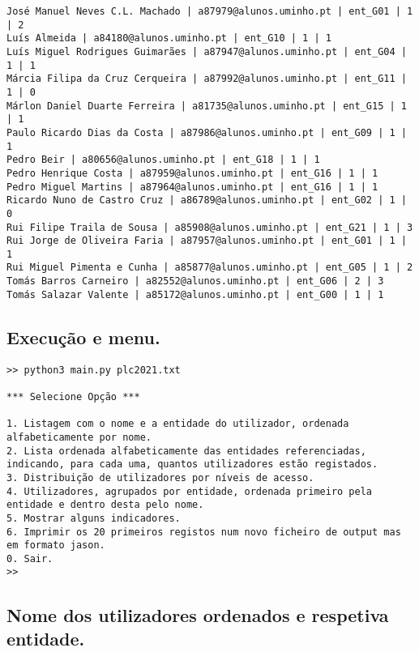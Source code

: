 \documentclass[11pt,a4paper]{report}%
\begin{document}
\begin{verbatim}
José Manuel Neves C.L. Machado | a87979@alunos.uminho.pt | ent_G01 | 1 | 2
Luís Almeida | a84180@alunos.uminho.pt | ent_G10 | 1 | 1
Luís Miguel Rodrigues Guimarães | a87947@alunos.uminho.pt | ent_G04 | 1 | 1
Márcia Filipa da Cruz Cerqueira | a87992@alunos.uminho.pt | ent_G11 | 1 | 0
Márlon Daniel Duarte Ferreira | a81735@alunos.uminho.pt | ent_G15 | 1 | 1
Paulo Ricardo Dias da Costa | a87986@alunos.uminho.pt | ent_G09 | 1 | 1
Pedro Beir | a80656@alunos.uminho.pt | ent_G18 | 1 | 1
Pedro Henrique Costa | a87959@alunos.uminho.pt | ent_G16 | 1 | 1
Pedro Miguel Martins | a87964@alunos.uminho.pt | ent_G16 | 1 | 1
Ricardo Nuno de Castro Cruz | a86789@alunos.uminho.pt | ent_G02 | 1 | 0
Rui Filipe Traila de Sousa | a85908@alunos.uminho.pt | ent_G21 | 1 | 3
Rui Jorge de Oliveira Faria | a87957@alunos.uminho.pt | ent_G01 | 1 | 1
Rui Miguel Pimenta e Cunha | a85877@alunos.uminho.pt | ent_G05 | 1 | 2
Tomás Barros Carneiro | a82552@alunos.uminho.pt | ent_G06 | 2 | 3
Tomás Salazar Valente | a85172@alunos.uminho.pt | ent_G00 | 1 | 1
\end{verbatim}


\subsection{Execução e menu.}
\begin{small}
\begin{verbatim}
>> python3 main.py plc2021.txt

*** Selecione Opção ***

1. Listagem com o nome e a entidade do utilizador, ordenada alfabeticamente por nome.
2. Lista ordenada alfabeticamente das entidades referenciadas, indicando, para cada uma, quantos utilizadores estão registados.
3. Distribuição de utilizadores por níveis de acesso.
4. Utilizadores, agrupados por entidade, ordenada primeiro pela entidade e dentro desta pelo nome.
5. Mostrar alguns indicadores.
6. Imprimir os 20 primeiros registos num novo ficheiro de output mas em formato jason.
0. Sair.
>> 
\end{verbatim}
\end{small}

\subsection{Nome dos utilizadores ordenados e respetiva entidade.}
\end{document}
